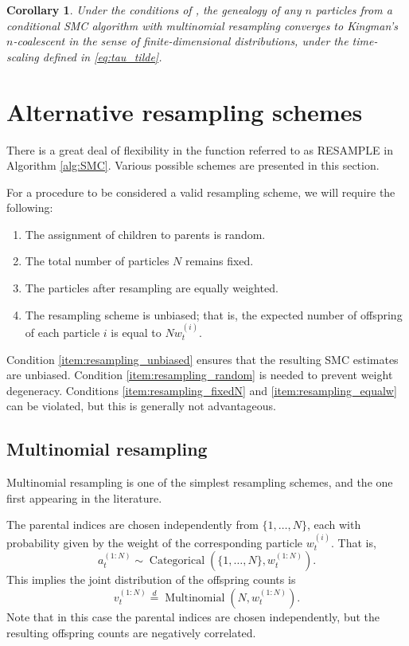 \documentclass[fleqn]{article}
\newtheorem{corollary}{Corollary}
\theoremstyle{definition}
\newcommand{\eqdist}{\overset{d}{=}}
\newcommand{\Cat}{\operatorname{Categorical}}
\newcommand{\vt}[2][t]{v_{#1}^{(#2)}}
\newcommand{\wt}[2][t]{w_{#1}^{(#2)}}
\begin{document}
\begin{corollary}\label{thm:condSMC_kingman}
Under the conditions of \citet[Lemma 3]{koskela2018}, the genealogy of any $n$ particles from a conditional SMC algorithm with multinomial resampling converges to Kingman's $n$-coalescent in the sense of finite-dimensional distributions, under the time-scaling defined in \eqref{eq:tau_tilde}.
\end{corollary}


\section{Alternative resampling schemes}\label{sec:resampling}
There is a great deal of flexibility in the function referred to as {\footnotesize RESAMPLE} in Algorithm \ref{alg:SMC}.
Various possible schemes are presented in this section.

For a procedure to be considered a valid resampling scheme, we will require the following:
\begin{enumerate}
\item The assignment of children to parents is random. \label{item:resampling_random}
\item The total number of particles $N$ remains fixed. \label{item:resampling_fixedN}
\item The particles after resampling are equally weighted. \label{item:resampling_equalw}
\item The resampling scheme is unbiased; that is, the expected number of offspring of each particle $i$ is equal to $N\wt{i}$. \label{item:resampling_unbiased}
\end{enumerate}
Condition \ref{item:resampling_unbiased} ensures that the resulting SMC estimates are unbiased. Condition \ref{item:resampling_random} is needed to prevent weight degeneracy. Conditions \ref{item:resampling_fixedN} and \ref{item:resampling_equalw} can be violated, but this is generally not advantageous.

\subsection{Multinomial resampling}
Multinomial resampling \citep{efron1994} is one of the simplest resampling schemes, and the one first appearing in the literature.
 
The parental indices are chosen independently from $\{1, \dots, N\}$, each with probability given by the weight of the corresponding particle $\wt{i}$. 
That is, 
\begin{equation*}
a_t^{(1:N)} \sim \Cat(\{1,\dots, N\}, \wt{1:N}) .
\end{equation*}
This implies the joint distribution of the offspring counts is 
\begin{equation*}
\vt{1:N} \eqdist \operatorname{Multinomial}(N, \wt{1:N}) .
\end{equation*}
Note that in this case the parental indices are chosen independently, but the resulting offspring counts are negatively correlated.
\end{document}
